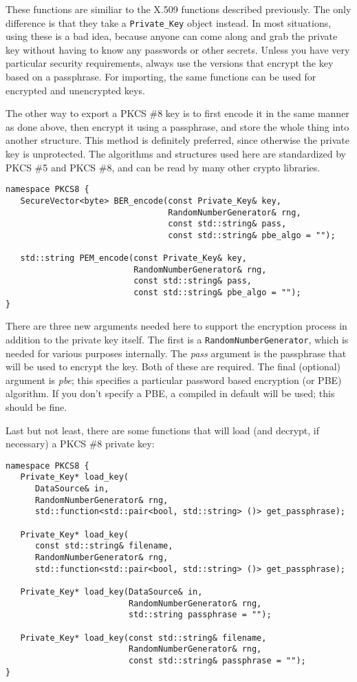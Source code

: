 \documentclass{article}
\newcommand{\type}[1]{\texttt{#1}}
\renewcommand{\arg}[1]{\textsl{#1}}
\begin{document}
These functions are similiar to the X.509 functions described
previously. The only difference is that they take a
\type{Private\_Key} object instead. In most situations, using these is
a bad idea, because anyone can come along and grab the private key
without having to know any passwords or other secrets. Unless you have
very particular security requirements, always use the versions that
encrypt the key based on a passphrase. For importing, the same
functions can be used for encrypted and unencrypted keys.

The other way to export a PKCS \#8 key is to first encode it in the
same manner as done above, then encrypt it using a passphrase, and
store the whole thing into another structure. This method is
definitely preferred, since otherwise the private key is
unprotected. The algorithms and structures used here are standardized
by PKCS \#5 and PKCS \#8, and can be read by many other crypto
libraries.

\begin{verbatim}
namespace PKCS8 {
   SecureVector<byte> BER_encode(const Private_Key& key,
                                 RandomNumberGenerator& rng,
                                 const std::string& pass,
                                 const std::string& pbe_algo = "");

   std::string PEM_encode(const Private_Key& key,
                          RandomNumberGenerator& rng,
                          const std::string& pass,
                          const std::string& pbe_algo = "");
}
\end{verbatim}

There are three new arguments needed here to support the encryption
process in addition to the private key itself. The first is a
\type{RandomNumberGenerator}, which is needed for various purposes
internally. The \arg{pass} argument is the passphrase that will be
used to encrypt the key. Both of these are required. The final
(optional) argument is \arg{pbe}; this specifies a particular password
based encryption (or PBE) algorithm. If you don't specify a PBE,
a compiled in default will be used; this should be fine.

Last but not least, there are some functions that will load (and
decrypt, if necessary) a PKCS \#8 private key:

\begin{verbatim}
namespace PKCS8 {
   Private_Key* load_key(
      DataSource& in,
      RandomNumberGenerator& rng,
      std::function<std::pair<bool, std::string> ()> get_passphrase);

   Private_Key* load_key(
      const std::string& filename,
      RandomNumberGenerator& rng,
      std::function<std::pair<bool, std::string> ()> get_passphrase);

   Private_Key* load_key(DataSource& in,
                         RandomNumberGenerator& rng,
                         std::string passphrase = "");

   Private_Key* load_key(const std::string& filename,
                         RandomNumberGenerator& rng,
                         const std::string& passphrase = "");
}
\end{verbatim}
\end{document}
